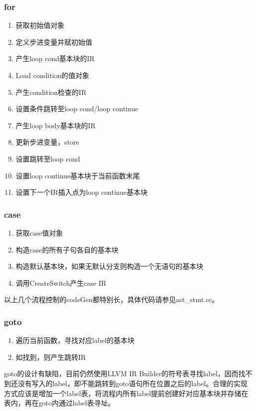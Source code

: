 \documentclass{article}
\begin{document}
\subsubsection{for}
\begin{enumerate}
  \item 获取初始值对象
  \item 定义步进变量并赋初始值
  \item 产生loop cond基本块的IR
  \item Load condition的值对象
  \item 产生condition检查的IR
  \item 设置条件跳转至loop cond/loop continue
  \item 产生loop body基本块的IR
  \item 更新步进变量，store
  \item 设置跳转至loop cond
  \item 设置loop continue基本块于当前函数末尾
  \item 设置下一个IR插入点为loop continue基本块
\end{enumerate}

\subsubsection{case}
\begin{enumerate}
  \item 获取case值对象
  \item 构造case的所有子句各自的基本块
  \item 构造默认基本块，如果无默认分支则构造一个无语句的基本块
  \item 调用CreateSwitch产生case IR
\end{enumerate}

\par 以上几个流程控制的codeGen都特别长，具体代码请参见ast\_stmt.cc。

\subsubsection{goto}
\begin{enumerate}
  \item 遍历当前函数，寻找对应label的基本块
  \item 如找到，则产生跳转IR
\end{enumerate}

\par goto的设计有缺陷，目前仍然使用LLVM IR Builder的符号表寻找label，因而找不到还没有写入的label，即不能跳转到goto语句所在位置之后的label。合理的实现方式应该是增加一个label表，将流程内所有label提前创建好对应基本块并存储在表内，再在goto内通过label表寻址。
\end{document}
